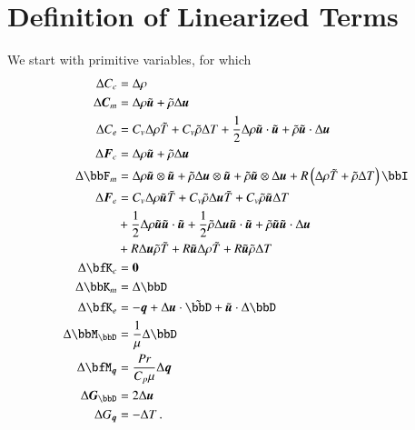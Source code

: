 \documentclass[preprint,12pt]{elsarticle}
\begin{document}

\appendix

\section{Definition of Linearized Terms}
\label{ap:linearization}

We start with primitive variables, for which
\begin{align*}
\Delta C_c&=\Delta\rho\\
\Delta\bfC_m&=\Delta\rho\tilde\bfu+\tilde\rho\Delta\bfu\\
\Delta C_e&=C_v\Delta\rho\tilde T+C_v\tilde\rho\Delta T
+\frac{1}{2}\Delta\rho\tilde\bfu\cdot\tilde\bfu+\tilde\rho\tilde\bfu\cdot\Delta\bfu\\
%
\Delta\bfF_c&=\Delta\rho\tilde\bfu+\tilde\rho\Delta\bfu\\
\Delta\bbF_m&=\Delta\rho\tilde\bfu\otimes\tilde\bfu+\tilde\rho\Delta\bfu\otimes\tilde\bfu+\tilde\rho\tilde\bfu\otimes\Delta\bfu
+R\LRp{\Delta\rho\tilde T+\tilde\rho\Delta T}\bbI\\
\Delta\bfF_e&=C_v\Delta\rho\tilde\bfu\tilde T+C_v\tilde\rho\Delta\bfu\tilde T+C_v\tilde\rho\tilde\bfu\Delta T\\
&+\frac{1}{2}\Delta\rho\tilde\bfu\tilde\bfu\cdot\tilde\bfu
+\frac{1}{2}\tilde\rho\Delta\bfu\tilde\bfu\cdot\tilde\bfu
+\tilde\rho\tilde\bfu\tilde\bfu\cdot\Delta\bfu\\
&+R\Delta\bfu\tilde\rho\tilde T
+R\tilde\bfu\Delta\rho\tilde T
+R\tilde\bfu\tilde\rho\Delta T\\
%
\Delta\bfK_c&=\bs0\\
\Delta\bbK_m&=\Delta\bbD\\
\Delta\bfK_e&=-\bfq+\Delta\bfu\cdot\tilde\bbD+\tilde\bfu\cdot\Delta\bbD\\
\Delta \bbM_\bbD&=\frac{1}{\mu}\Delta \bbD\\
\Delta \bfM_{\bfq}&=\frac{Pr}{C_p\mu}\Delta\bfq\\
\Delta \bfG_\bbD&=2\Delta\bfu\\
\Delta G_{\bfq}&=-\Delta T\,.
\end{align*}
\end{document}
